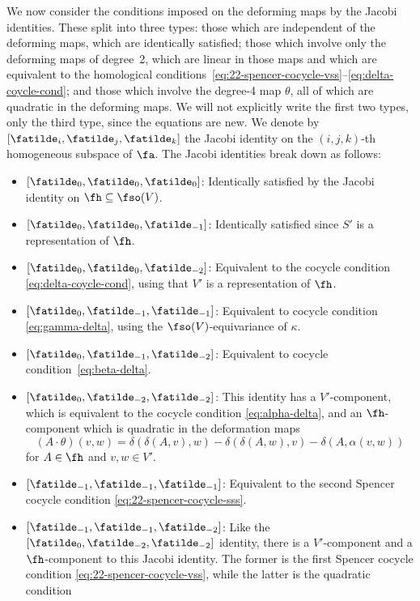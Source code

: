 We now consider the conditions imposed on the deforming maps by the Jacobi identities. These split into three types: those which are independent of the deforming maps, which are identically satisfied; those which involve only the deforming maps of degree~2, which are linear in those maps and which are equivalent to the homological conditions~\eqref{eq:22-spencer-cocycle-vss}--\eqref{eq:delta-coycle-cond}; and those which involve the degree-4 map $\theta$, all of which are quadratic in the deforming maps. We will not explicitly write the first two types, only the third type, since the equations are new. We denote by $[\fatilde_i,\fatilde_j,\fatilde_k]$ the Jacobi identity on the $(i, j,k)$-th homogeneous subspace of $\fa$. The Jacobi identities break down as follows:
\begin{itemize}\itemsep=0pt
	\item $[\fatilde_0,\fatilde_0,\fatilde_0]$: Identically satisfied by the Jacobi identity on $\fh\subseteq \fso(V)$.
	\item $[\fatilde_0,\fatilde_0,\fatilde_{-1}]$: Identically satisfied since $S'$ is a representation of $\fh$.
	\item $[\fatilde_0,\fatilde_0,\fatilde_{-2}]$: Equivalent to the cocycle condition \eqref{eq:delta-coycle-cond}, using that $V'$ is a representation of $\fh$.
	\item $[\fatilde_0,\fatilde_{-1},\fatilde_{-1}]$: Equivalent to cocycle condition \eqref{eq:gamma-delta}, using the $\fso(V)$-equivariance of $\kappa$.
	\item $[\fatilde_0,\fatilde_{-1},\fatilde_{-2}]$: Equivalent to cocycle condition~\eqref{eq:beta-delta}.
	\item $[\fatilde_0,\fatilde_{-2},\fatilde_{-2}]$: This identity has a $V'$-component, which is equivalent to the cocycle condition \eqref{eq:alpha-delta}, and an $\fh$-component which is quadratic in the deformation maps
		\begin{equation}\label{eq:jacobi-022}
			(A\cdot\theta)(v,w) = \delta(\delta(A,v),w) - \delta(\delta(A,w),v) - \delta(A,\alpha(v,w))
		\end{equation}
	for $A\in\fh$ and $v,w\in V'$.
	\item $[\fatilde_{-1},\fatilde_{-1},\fatilde_{-1}]$: Equivalent to the second Spencer cocycle condition \eqref{eq:22-spencer-cocycle-sss}.
	\item $[\fatilde_{-1},\fatilde_{-1},\fatilde_{-2}]$: Like the $[\fatilde_0,\fatilde_{-2},\fatilde_{-2}]$ identity, there is a $V'$-component and a $\fh$-component to this Jacobi identity. The former is the first Spencer cocycle condition \eqref{eq:22-spencer-cocycle-vss}, while the latter is the quadratic condition

\end{itemize}
